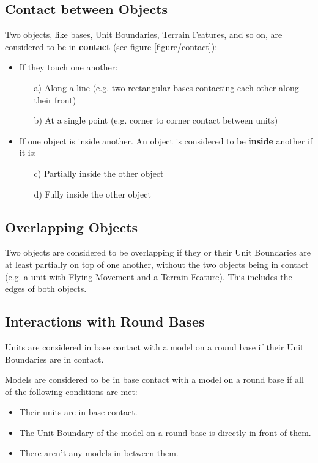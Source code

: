 \newpage
\subsection{Contact between Objects}
\label{contact_between_objects}

Two objects, like bases, Unit Boundaries, Terrain Features, and so on, are considered to be in \textbf{contact} (see figure \ref{figure/contact}):

\begin{itemize}
\item If they touch one another:
\begin{itemize}[label={}]
\item[a)] Along a line (e.g. two rectangular bases contacting each other along their front)
\item[b)] At a single point (e.g. corner to corner contact between units)
\end{itemize}
\item If one object is inside another. An object is considered to be \textbf{inside} another if it is:
\begin{itemize}[label={}]
\item[c)] Partially inside the other object
\item [d)] Fully inside the other object
\end{itemize}
\end{itemize}

\subsection{Overlapping Objects}
\label{overlapping_of_objects}

Two objects are considered to be overlapping if they or their Unit Boundaries are at least partially on top of one another, without the two objects being in contact (e.g. a unit with Flying Movement and a Terrain Feature). This includes the edges of both objects.

\subsection{Interactions with Round Bases}
\label{interactions_with_round_bases}


Units are considered in base contact with a model on a round base if their Unit Boundaries are in contact.

Models are considered to be in base contact with a model on a round base if all of the following conditions are met:
\begin{itemize}
\item Their units are in base contact.
\item The Unit Boundary of the model on a round base is directly in front of them.
\item There aren't any models in between them.
\end{itemize}

